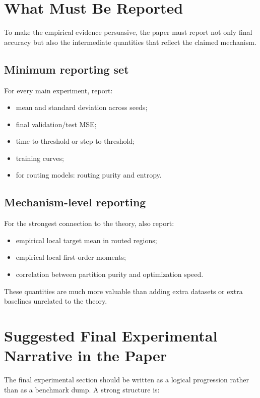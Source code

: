 \documentclass[11pt]{article}
\begin{document}
\section{What Must Be Reported}

To make the empirical evidence persuasive, the paper must report not only final accuracy but also the intermediate quantities that reflect the claimed mechanism.

\subsection{Minimum reporting set}

For every main experiment, report:
\begin{itemize}[leftmargin=2em]
    \item mean and standard deviation across seeds;
    \item final validation/test MSE;
    \item time-to-threshold or step-to-threshold;
    \item training curves;
    \item for routing models: routing purity and entropy.
\end{itemize}

\subsection{Mechanism-level reporting}

For the strongest connection to the theory, also report:
\begin{itemize}[leftmargin=2em]
    \item empirical local target mean in routed regions;
    \item empirical local first-order moments;
    \item correlation between partition purity and optimization speed.
\end{itemize}

These quantities are much more valuable than adding extra datasets or extra baselines unrelated to the theory.

\section{Suggested Final Experimental Narrative in the Paper}

The final experimental section should be written as a logical progression rather than as a benchmark dump. A strong structure is:
\end{document}
